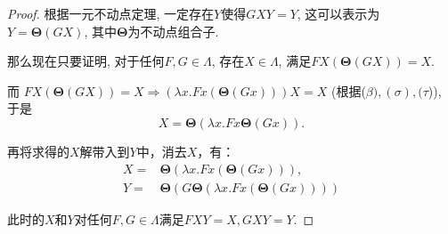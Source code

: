 \begin{proof}
    根据一元不动点定理, 一定存在$Y$使得$GXY=Y$, 这可以表示为$Y=\bm{\Theta}(GX)$, 其中$\bm{\Theta}$为不动点组合子.
	
	那么现在只要证明, 对于任何$F,G\in\Lambda$, 存在$X\in\Lambda$, 满足$FX(\bm{\Theta}(GX))=X$.
	
	而 $FX(\bm{\Theta}(GX))=X\Rightarrow (\lambda x.Fx(\bm{\Theta}(Gx)))X=X$ (根据($\beta),(\sigma),(\tau$)), 于是$$X=\bm{\Theta}(\lambda x.Fx\bm{\Theta}(Gx)).$$
	
	再将求得的$X$解带入到$Y$中，消去$X$，有：
	\begin{align*}
		X=&\bm{\Theta}(\lambda x.Fx(\bm{\Theta}(Gx))),\\
		Y=&\bm{\Theta}(G\bm{\Theta}(\lambda x.Fx(\bm{\Theta}(Gx))))
	\end{align*}
	
	此时的$X$和$Y$对任何$F,G\in\Lambda$满足$FXY=X, GXY=Y$.
\end{proof}